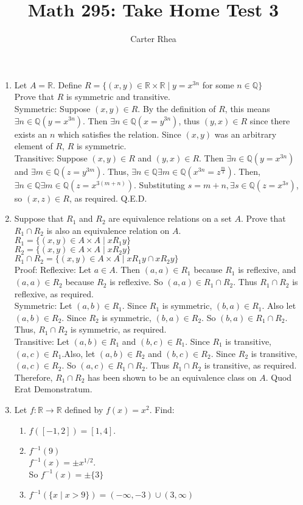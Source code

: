 \documentclass[10pt,a4paper]{article}
\author{Carter Rhea}
\title{Math 295: Take Home Test 3}
\begin{document}
\maketitle
\begin{enumerate}
\item Let $A = \mathbb{R}$. Define $R= \{(x,y) \in \mathbb{R} \times \mathbb{R} \mid y=x^{3n}$ for some $n \in \mathbb{Q}\}$\\
Prove that $R$ is symmetric and transitive.\\
Symmetric: Suppose $(x,y) \in R$. By the definition of $R$, this means $\exists n \in \mathbb{Q}(y=x^{3n})$. Then $\exists n \in \mathbb{Q}(x=y^{3n})$, thus $(y,x) \in R$ since there exists an $n$ which satisfies the relation. Since $(x,y)$ was an arbitrary element of $R$, $R$ is symmetric. \\
Transitive: Suppose $(x,y) \in R$ and $(y,x) \in R$. Then $\exists n \in \mathbb{Q}(y=x^{3n})$ and $\exists m \in \mathbb{Q}(z=y^{3m}).$ Thus, $\exists n \in \mathbb{Q} \exists m \in \mathbb{Q}(x^{3n}=z^{\frac{m}{3}})$. Then, $\exists n \in \mathbb{Q} \exists m \in \mathbb{Q}(z=x^{3(m+n)})$. Substituting $s=m+n, \exists s \in \mathbb{Q}(z=x^{3s})$, so $(x,z)\in R$, as required. Q.E.D.
\item Suppose that $R_1$ and $R_2$ are equivalence relations on a set $A$. Prove that $R_1 \cap R_2$ is also an equivalence relation on $A$.\\
$R_1=\{(x,y)\in A \times A \mid xR_1y \}$\\
$R_2=\{(x,y)\in A \times A \mid xR_2y \}$\\
$R_1\cap R_2=\{(x,y)\in A \times A \mid xR_1y \cap xR_2y \}$\\
Proof: Reflexive: Let $a \in A$. Then $(a,a) \in R_1$ because $R_1$ is reflexive, and $(a,a) \in R_2$ because $R_2$ is reflexive. So $(a,a) \in R_1 \cap R_2$. Thus $R_1 \cap R_2$ is reflexive, as required.\\
Symmetric: Let $(a,b) \in R_1$. Since $R_1$ is symmetric, $(b,a)\in R_1$. Also let $(a,b) \in R_2$. Since $R_2$ is symmetric, $(b,a) \in R_2$. So  $(b,a) \in R_1 \cap R_2$. Thus, $R_1 \cap R_2$ is symmetric, as required.\\
Transitive: Let $(a,b) \in R_1$ and $(b,c) \in R_1$. Since $R_1$ is transitive, $(a,c) \in R_1$.Also, let $(a,b) \in R_2$ and $(b,c) \in R_2$. Since $R_2$ is transitive, $(a,c) \in R_2$. So $(a,c) \in R_1 \cap R_2$. Thus $R_1 \cap R_2$ is transitive, as required.\\
Therefore, $R_1 \cap R_2$ has been shown to be an equivalence class on $A$. Quod Erat Demonstratum.
\item Let $f: \mathbb{R} \to \mathbb{R}$ defined by $f(x)=x^2$. Find: \\
\begin{enumerate}
\item $f([-1,2])=[1,4]	$.
\item $f^{-1}({9})$\\ $f^{-1}(x)=\pm x^{1/2}$.\\ So $f^{-1}(x)= \pm\{3\}$
\item $f^{-1}(\{x \mid x >9\})=(-\infty , -3) \cup (3,\infty)$
\end{enumerate}


\end{enumerate}
\end{document}
